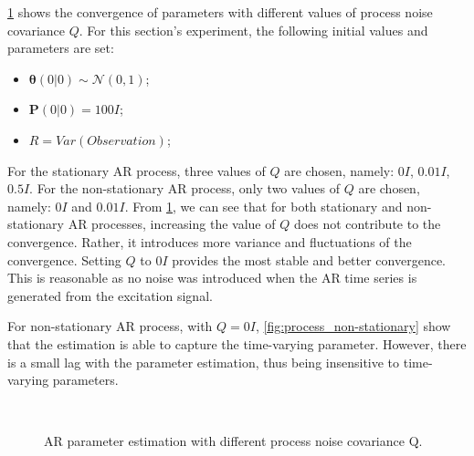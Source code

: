 \documentclass{article}
\begin{document}
\cref{fig:process} shows the convergence of parameters with different values of process noise covariance $Q$. For this section's experiment, the following initial values and parameters are set:
\begin{itemize}
    \item $\bm{\theta}(0|0) \sim \mathcal{N}(0, 1)$;
    \item $\bm{P}(0|0) = 100I$;
    \item $R = Var(Observation)$;
\end{itemize}

For the stationary AR process, three values of $Q$ are chosen, namely: $0I$, $0.01I$, $0.5I$. For the non-stationary AR process, only two values of $Q$ are chosen, namely: $0I$ and $0.01I$. From \cref{fig:process}, we can see that for both stationary and non-stationary AR processes, increasing the value of $Q$ does not contribute to the convergence. Rather, it introduces more variance and fluctuations of the convergence. Setting $Q$ to $0I$ provides the most stable and better convergence. This is reasonable as no noise was introduced when the AR time series is generated from the excitation signal.

For non-stationary AR process, with $Q = 0I$, \cref{fig:process_non-stationary} show that the estimation is able to capture the time-varying parameter. However, there is a small lag with the parameter estimation, thus being insensitive to time-varying parameters.


\begin{figure}[h!]
     \\
    \caption{AR parameter estimation with different process noise covariance Q.}
    \label{fig:process}
\end{figure}
\end{document}
